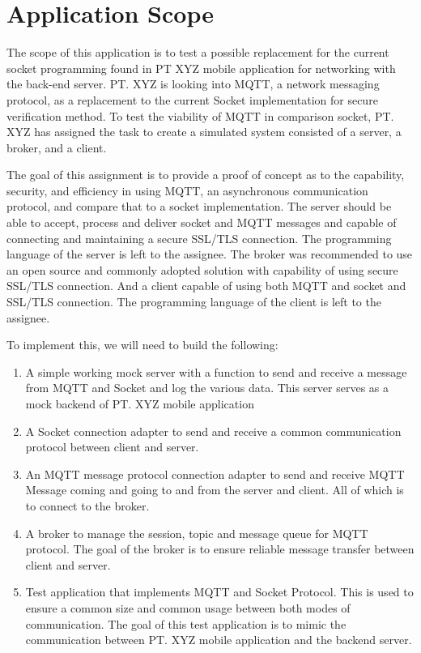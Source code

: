 \section{Application Scope}
The scope of this application is to test a possible replacement for the current socket programming found in PT XYZ mobile application for networking with the back-end server. PT. XYZ is looking into MQTT, a network messaging protocol, as a replacement to the current Socket implementation for secure verification method. To test the viability of MQTT in comparison socket, PT. XYZ has assigned the task to create a simulated system consisted of a server, a broker, and a client.

The goal of this assignment is to provide a proof of concept as to the capability, security, and efficiency in using MQTT, an asynchronous communication protocol, and compare that to a socket implementation.
The server should be able to accept, process and deliver socket and MQTT messages and capable of connecting and maintaining a secure SSL/TLS connection. The programming language of the server is left to the assignee. The broker was recommended to use an open source and commonly adopted solution with capability of using secure SSL/TLS connection. And a client capable of using both MQTT and socket and SSL/TLS connection. The programming language of the client is left to the assignee.

To implement this, we will need to build the following:
\begin{enumerate}
    \itemsep0em
    \item A simple working mock server with a function to send and receive a message from  MQTT and Socket and log the various data. This server serves as a mock backend of PT. XYZ mobile application
	\item A Socket connection adapter to send and receive a common communication protocol between client and server.
    \item An MQTT message protocol connection adapter to send and receive MQTT Message coming and going to and from the server and client. All of which is to connect to the broker.
	\item A broker to manage the session, topic and message queue for MQTT protocol. The goal of the broker is to ensure reliable message transfer between client and server.
    \item Test application that implements MQTT and Socket Protocol. This is used to ensure a common size and common usage between both modes of communication. The goal of this test application is to mimic the communication between PT. XYZ mobile application and the backend server.
\end{enumerate}

